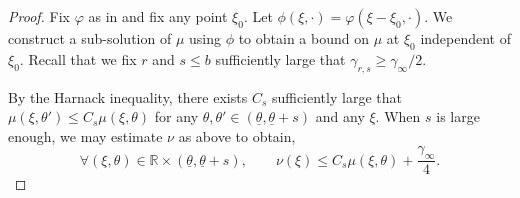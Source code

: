 \documentclass[11pt]{article}    %
\newcommand{\R}{\mathbb{R}}
\begin{document}
\begin{proof}%
Fix $\varphi$ as in  and fix any point $\xi_0$.  Let $\phi(\xi,\cdot) = \varphi(\xi - \xi_0, \cdot)$.  We construct a sub-solution of $\mu$ using $\phi$ to obtain a bound on $\mu$ at $\xi_0$ independent of $\xi_0$.  Recall that we fix $r$ and $s\leq b$ sufficiently large that $\gamma_{r,s} \geq \gamma_\infty/2$.

By the Harnack inequality, there exists $C_s$ sufficiently large that $\mu(\xi,\theta') \leq C_s \mu(\xi,\theta)$ for any $\theta, \theta'\in(\underline \theta, \underline\theta+s)$ and any $\xi$.  When $s$ is large enough, we may estimate $\nu$ as above to obtain,
\[
	\forall (\xi,\theta) \in \R\times (\underline\theta, \underline\theta + s), \qquad \nu(\xi) \leq C_s \mu(\xi,\theta) + \frac{\gamma_\infty}{4}.
\]




\end{proof}
\end{document}
